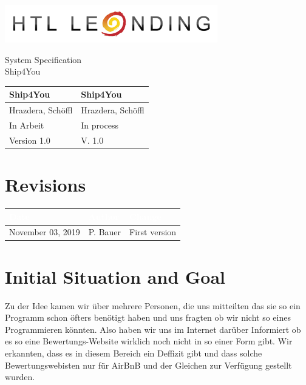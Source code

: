 \documentclass[12pt]{article}
\theoremstyle{definition}
\newcommand{\projectname}{Ship4You}
\newcommand{\productname}{Ship4You}
\newcommand{\projectleader}{Hrazdera, Schöffl}
\newcommand{\documentstatus}{In process}
\newcommand{\version}{V. 1.0}
\begin{document}
\begin{titlepage}
\begin{flushright}
\includegraphics[scale=.5]{htlleondinglogo.png}\\
\end{flushright}

\vspace{10em}

\begin{center}
{\Huge System Specification} \\[3em]
{\LARGE \productname} \\[3em]
\end{center}

\begin{flushleft}
\begin{tabular}{|l|l|}
\hline
Ship4You & \projectname \\ \hline
Hrazdera, Schöffl & \projectleader \\ \hline
In Arbeit & \documentstatus \\ \hline
Version 1.0 & \version \\ \hline
\end{tabular}
\end{flushleft}

\end{titlepage}
\section*{Revisions}
\begin{tabular}{|l|l|l|}
\hline
\cellcolor[gray]{0.5}\textcolor{white}{Date} & \cellcolor[gray]{0.5}\textcolor{white}{Author} & \cellcolor[gray]{0.5}\textcolor{white}{Change} \\ \hline
November 03, 2019&P. Bauer&First version \\ \hline
\end{tabular}
\pagebreak

\tableofcontents
\pagebreak

\section{Initial Situation and Goal}
	Zu der Idee kamen wir über mehrere Personen, die uns mitteilten das sie so ein Programm schon öfters benötigt haben und uns fragten ob wir nicht so eines Programmieren könnten. Also haben wir uns im Internet darüber Informiert ob es so eine Bewertungs-Website wirklich noch nicht in so einer Form gibt.
	Wir erkannten, dass es in diesem Bereich ein Deffizit gibt und dass solche Bewertungswebisten nur für AirBnB und der Gleichen zur Verfügung gestellt wurden.
	
\end{document}
